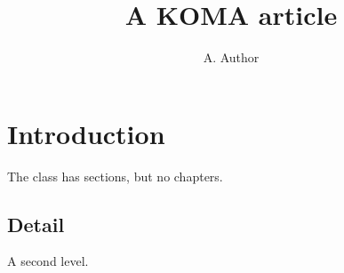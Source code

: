 \documentclass[fontsize=11pt,paper=a4,DIV=12,oneside]{scrartcl}
\begin{document}
\title{A KOMA article}\author{A. Author}\date{}\maketitle
\tableofcontents\section{Introduction}The class has sections, but no chapters.\subsection{Detail}A second level.
\end{document}
